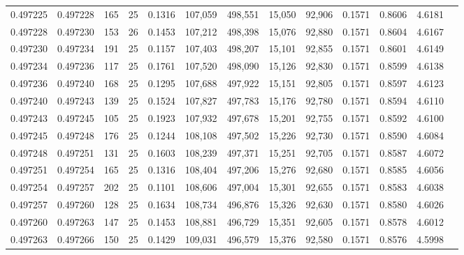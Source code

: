 \begin{tabular}{rrrrrrrrrrrrr}
0.497225 & 0.497228 & 165 &  25 &                                     0.1316 & 107,059 & 498,551 &  15,050 &  92,906 & 0.1571 & 0.8606 & 4.6181 \\
0.497228 & 0.497230 & 153 &  26 &                                     0.1453 & 107,212 & 498,398 &  15,076 &  92,880 & 0.1571 & 0.8604 & 4.6167 \\
0.497230 & 0.497234 & 191 &  25 &                                     0.1157 & 107,403 & 498,207 &  15,101 &  92,855 & 0.1571 & 0.8601 & 4.6149 \\
0.497234 & 0.497236 & 117 &  25 &                                     0.1761 & 107,520 & 498,090 &  15,126 &  92,830 & 0.1571 & 0.8599 & 4.6138 \\
0.497236 & 0.497240 & 168 &  25 &                                     0.1295 & 107,688 & 497,922 &  15,151 &  92,805 & 0.1571 & 0.8597 & 4.6123 \\
0.497240 & 0.497243 & 139 &  25 &                                     0.1524 & 107,827 & 497,783 &  15,176 &  92,780 & 0.1571 & 0.8594 & 4.6110 \\
0.497243 & 0.497245 & 105 &  25 &                                     0.1923 & 107,932 & 497,678 &  15,201 &  92,755 & 0.1571 & 0.8592 & 4.6100 \\
0.497245 & 0.497248 & 176 &  25 &                                     0.1244 & 108,108 & 497,502 &  15,226 &  92,730 & 0.1571 & 0.8590 & 4.6084 \\
0.497248 & 0.497251 & 131 &  25 &                                     0.1603 & 108,239 & 497,371 &  15,251 &  92,705 & 0.1571 & 0.8587 & 4.6072 \\
0.497251 & 0.497254 & 165 &  25 &                                     0.1316 & 108,404 & 497,206 &  15,276 &  92,680 & 0.1571 & 0.8585 & 4.6056 \\
0.497254 & 0.497257 & 202 &  25 &                                     0.1101 & 108,606 & 497,004 &  15,301 &  92,655 & 0.1571 & 0.8583 & 4.6038 \\
0.497257 & 0.497260 & 128 &  25 &                                     0.1634 & 108,734 & 496,876 &  15,326 &  92,630 & 0.1571 & 0.8580 & 4.6026 \\
0.497260 & 0.497263 & 147 &  25 &                                     0.1453 & 108,881 & 496,729 &  15,351 &  92,605 & 0.1571 & 0.8578 & 4.6012 \\
0.497263 & 0.497266 & 150 &  25 &                                     0.1429 & 109,031 & 496,579 &  15,376 &  92,580 & 0.1571 & 0.8576 & 4.5998 \\

\end{tabular}
